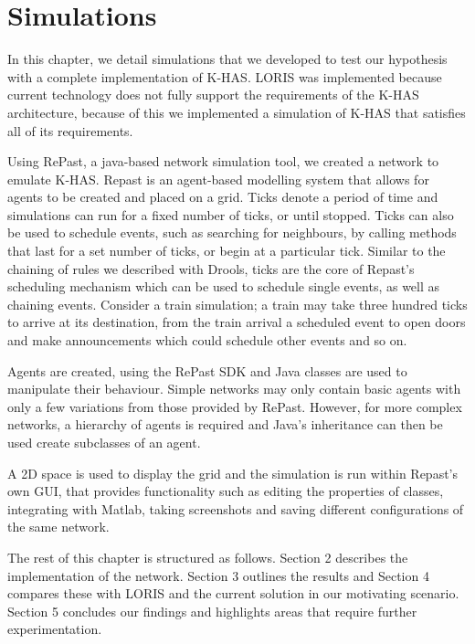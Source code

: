\chapter{Simulations}
In this chapter, we detail simulations that we developed to test our hypothesis with a complete implementation of K-HAS. LORIS was implemented because current technology does not fully support the requirements of the K-HAS architecture, because of this we implemented a simulation of K-HAS that satisfies all of its requirements.

Using RePast, a java-based network simulation tool, we created a network to emulate K-HAS. Repast is an agent-based modelling system that allows for agents to be created and placed on a grid. Ticks denote a period of time and simulations can run for a fixed number of ticks, or until stopped. Ticks can also be used to schedule events, such as searching for neighbours, by calling methods that last for a set number of ticks, or begin at a particular tick. Similar to the chaining of rules we described with Drools, ticks are the core of Repast's scheduling mechanism which can be used to schedule single events, as well as chaining events. Consider a train simulation; a train may take three hundred ticks to arrive at its destination, from the train arrival a scheduled event to open doors and make announcements which could schedule other events and so on.

Agents are created, using the RePast SDK and Java classes are used to manipulate their behaviour. Simple networks may only contain basic agents with only a few variations from those provided by RePast. However, for more complex networks, a hierarchy of agents is required and Java's inheritance can then be used create subclasses of an agent.

A 2D space is used to display the grid and the simulation is run within Repast's own GUI, that provides functionality such as editing the properties of classes, integrating with Matlab, taking screenshots and saving different configurations of the same network.

The rest of this chapter is structured as follows. Section 2 describes the implementation of the network. Section 3 outlines the results and Section 4 compares these with LORIS and the current solution in our motivating scenario. Section 5 concludes our findings and highlights areas that require further experimentation.

